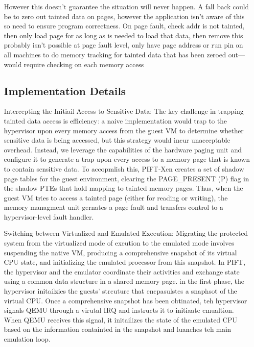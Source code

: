 However this doesn't guarantee the situation will never happen.
%
A fall back could be to zero out tainted data on pages, however the application
isn't aware of this so need to ensure program correctness.
%
On page fault, check addr is not tainted, then only load page for as long as is
needed to load that data, then remove this probably isn't possible at page
fault level, only have page address or run pin on all machines to do memory
tracking for tainted data that has been zeroed out---would require checking on
each memory access




\subsection{Implementation Details}
Intercepting the Initiail Access to Sensitive Data:  The key challenge in
trapping tainted data access is efficiency: a naive implementation would trap to
the hypervisor upon every memory access from the guest VM to determine whether
sensitive data is being accessed, but this strategy would incur unacceptable
overhead.  Instead, we leverage the capabilities of the hardware paging unit
and configure it to generate a trap upon every access to a memory page that is
known to contain sensitive data.  To accopmlish this, PIFT-Xen creates a set of
shadow page tables for the guest environment, clearing the PAGE\_PRESENT (P)
flag in the shadow PTEs that hold mapping to tainted memory pages.  Thus, when
the guest VM tries to access a tainted page (either for reading or writing),
the memory managment unit gernates a  page fault and transfers control to a
hypervisor-level fault handler.


Switching between Virtualized and Emulated Execution: Migrating the protected
system from the virtualized mode of exeution to the emulated mode involves
suspending the native VM, producing a comprehensive snapshot of its virtual CPU
state, and initializing the emulated processor from this snapshot.  In PIFT,
the
hypervisor and the emulator coordinate their activities and exchange state using
a common data structure in a shared memory page.  in the first phase, the
hypervisor initailzies the guests' strcuture that encpasulstes a snaphsot of
the virtual CPU.  Once a comprehensive snapshot has been obtinated, teh
hypervisor signals QEMU through a virutal IRQ and instructs it to initiaate
emualtion.  When QEMU receives this signal, it initailizes the state of the
emulated CPU based on the information containted in the snapshot and luanches
teh main emulation loop.


